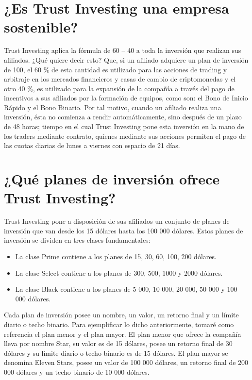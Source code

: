 \documentclass[12pt,letterpaper]{article}
\begin{document}
	\section{¿Es Trust Investing una empresa sostenible?}
	Trust Investing aplica la fórmula de 60 – 40 a toda la inversión que realizan sus afiliados. ¿Qué quiere decir esto? Que, si un afiliado adquiere un plan de inversión de 100, el 60 \% de esta cantidad es utilizado para las acciones de trading y arbitraje en los mercados financieros y casas de cambio de criptomonedas y el otro 40 \%, es utilizado para la expansión de la compañía a través del pago de incentivos a sus afiliados por la formación de equipos, como son: el Bono de Inicio Rápido y el Bono Binario.
	Por tal motivo, cuando un afiliado realiza una inversión, ésta no comienza a rendir automáticamente, sino después de un plazo de 48 horas; tiempo en el cual Trust Investing pone esta inversión en la mano de los traders mediante contrato, quienes mediante sus acciones permiten el pago de las cuotas diarias de lunes a viernes con espacio de 21 días.
	
	\section{¿Qué planes de inversión ofrece Trust Investing?}
	Trust Investing pone a disposición de sus afiliados un conjunto de planes de inversión que van desde los 15 dólares hasta los 100 000 dólares. Estos planes de inversión se dividen en tres clases fundamentales:
	
	\begin{itemize}
		\item La clase Prime contiene a los planes de 15, 30, 60, 100, 200 dólares.
		\item La clase Select contiene a los planes de 300, 500, 1000 y 2000 dólares.
		\item La clase Black contiene a los planes de 5 000, 10 000, 20 000, 50 000 y 100 000 dólares.
	\end{itemize}

Cada plan de inversión posee un nombre, un valor, un retorno final y un límite diario o techo binario. Para ejemplificar lo dicho anteriormente, tomaré como referencia el plan menor y el plan mayor. El plan menor que ofrece la compañía lleva por nombre Star, su valor es de 15 dólares, posee un retorno final de 30 dólares y su límite diario o techo binario es de 15 dólares. El plan mayor se denomina Eleven Stars, posee un valor de 100 000 dólares, un retorno final de 200 000 dólares y un techo binario de 10 000 dólares.
\end{document}
